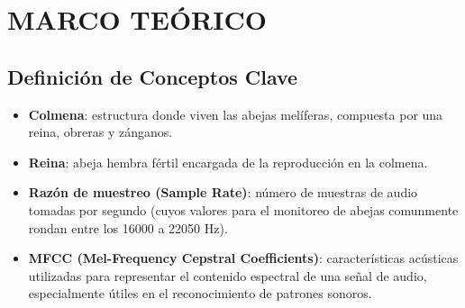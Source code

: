 \documentclass[12pt]{report}
\newenvironment{tightmulticols}{%
  \begin{multicols}{2}
  \setlength{\parskip}{0pt}
  \setlength{\parindent}{0em}
  \linespread{1}\selectfont
}{%
  \end{multicols}
}
\begin{document}

\pagebreak
\chapter{MARCO TEÓRICO}
\vspace{-3em}

\begin{tightmulticols}


\section{Definición de Conceptos Clave}

\begin{itemize}
    \item[\ding{43}] \textbf{Colmena}: estructura donde viven las abejas melíferas, compuesta por una reina, obreras y zánganos.
	\item[\ding{43}] \textbf{Reina}: abeja hembra fértil encargada de la reproducción en la colmena.
	\item[\ding{43}] \textbf{Razón de muestreo (Sample Rate)}: número de muestras de audio tomadas por segundo (cuyos valores para el monitoreo de abejas comunmente rondan entre los 16000 a 22050 Hz).
	\item[\ding{43}] \textbf{MFCC (Mel-Frequency Cepstral Coefficients)}: características acústicas utilizadas para representar el contenido espectral de una señal de audio, especialmente útiles en el reconocimiento de patrones sonoros.
\end{itemize}




\end{tightmulticols}
\end{document}
